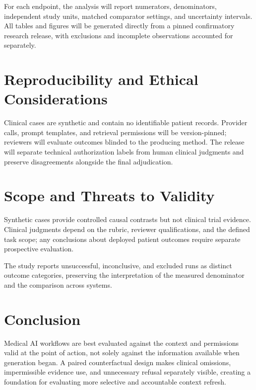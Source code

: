 \documentclass[11pt,a4paper]{article}
\begin{document}
For each endpoint, the analysis will report numerators, denominators, independent study units, matched comparator settings, and uncertainty intervals. All tables and figures will be generated directly from a pinned confirmatory research release, with exclusions and incomplete observations accounted for separately.

\section{Reproducibility and Ethical Considerations}
Clinical cases are synthetic and contain no identifiable patient records. Provider calls, prompt templates, and retrieval permissions will be version-pinned; reviewers will evaluate outcomes blinded to the producing method. The release will separate technical authorization labels from human clinical judgments and preserve disagreements alongside the final adjudication.

\section{Scope and Threats to Validity}
Synthetic cases provide controlled causal contrasts but not clinical trial evidence. Clinical judgments depend on the rubric, reviewer qualifications, and the defined task scope; any conclusions about deployed patient outcomes require separate prospective evaluation.

The study reports unsuccessful, inconclusive, and excluded runs as distinct outcome categories, preserving the interpretation of the measured denominator and the comparison across systems.

\section{Conclusion}
Medical AI workflows are best evaluated against the context and permissions valid at the point of action, not solely against the information available when generation began. A paired counterfactual design makes clinical omissions, impermissible evidence use, and unnecessary refusal separately visible, creating a foundation for evaluating more selective and accountable context refresh.



\end{document}
